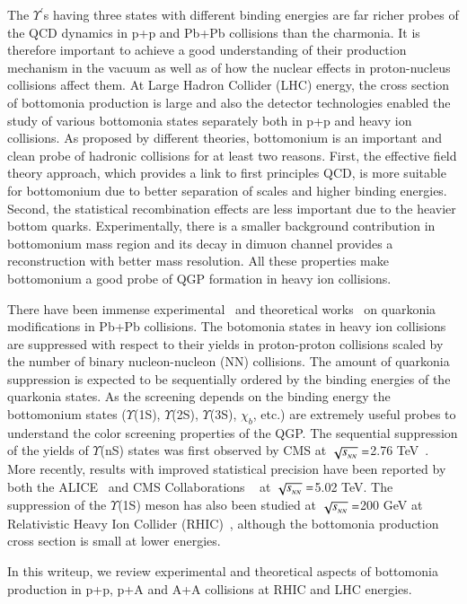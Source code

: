 The $\Upsilon^{'}$s having three states with different binding
energies are far richer probes of the QCD dynamics in p+p and Pb+Pb collisions than
the charmonia.
It is therefore important to achieve a good understanding of their
production mechanism in the vacuum as well as of how the nuclear effects in proton-nucleus
collisions affect them.
  At Large Hadron Collider (LHC) energy, the cross section of bottomonia production is large and
also the detector technologies enabled the study of various bottomonia 
states separately both in p+p and heavy ion collisions.
As proposed by different theories, bottomonium is an important and clean probe 
of hadronic collisions for at least two reasons. 
First, the effective field theory approach, which provides a link to first 
principles QCD, is more suitable for bottomonium due to better separation of 
scales and higher binding energies. Second, the statistical recombination effects 
are less important due to  the heavier bottom quarks.  
Experimentally, there is a smaller background contribution in bottomonium
mass region and its decay in dimuon channel provides a reconstruction with better
mass resolution. 
 All these properties make bottomonium a good probe of 
QGP formation in heavy ion collisions.


There have been immense
experimental~\cite{Sirunyan:2017isk,Sirunyan:2017lzi,CMS:2018zza,Acharya:2019iur,ALICE:2018wzm}
and theoretical works~\cite{Strickland:2011mw,Song:2011nu,Kumar:2014kfa,Kumar:2019xdj} on
quarkonia modifications in Pb+Pb collisions.
The botomonia states in heavy ion collisions are suppressed with respect to their yields
in proton-proton collisions scaled by the number of binary nucleon-nucleon
(NN) collisions.
The amount of quarkonia suppression is expected to be sequentially ordered by the binding
energies of the quarkonia states.
 As the screening depends on the  binding energy the bottomonium states ($\Upsilon$(1S), $\Upsilon$(2S),
$\Upsilon$(3S), $\chi_{b}$, etc.) are extremely useful probes to understand the color screening
properties of the QGP.
The sequential suppression of the yields of $\Upsilon$(nS) states was first observed by
CMS at $\sqrt{s_{_{NN}}} =$2.76 TeV~\cite{Chatrchyan:2011pe,Chatrchyan:2012lxa}. More recently, results with improved
statistical precision have been reported by both the ALICE~\cite{ALICE:2018wzm}
and CMS Collaborations ~\cite{Sirunyan:2017lzi,CMS:2018zza} at $\sqrt{s_{_{NN}}} =$5.02 TeV.
The suppression of the $\Upsilon$(1S)
meson has also been studied at $\sqrt{s_{_{NN}}} =$200 GeV at Relativistic Heavy Ion Collider (RHIC)~\cite{STAR:2013kwk}, although the
bottomonia production cross section is small at lower energies. 

In this writeup, we review experimental and theoretical aspects of bottomonia production in p+p, p+A
and A+A collisions at RHIC and LHC energies.








